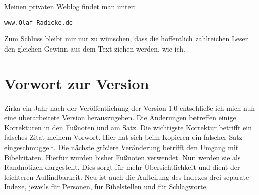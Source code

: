 Meinen privaten Weblog findet man unter:

\begin{center}
\texttt{www.Olaf-Radicke.de}
\end{center}

Zum Schluss bleibt mir nur zu wünschen, dass die hoffentlich zahlreichen Leser
den gleichen Gewinn aus dem Text ziehen werden, wie ich.


\chapter{Vorwort zur Version \versionsnummer}

Zirka ein Jahr nach der Veröffentlichung der Version 1.0 entschließe ich mich 
nun eine überarbeitete Version herauszugeben. Die Änderungen betreffen einige
Korrekturen in den Fußnoten und am Satz. Die wichtigste Korrektur betrifft ein 
falsches Zitat meinem Vorwort. Hier hat sich beim Kopieren ein falscher Satz 
eingeschmuggelt. Die nächste größere Veränderung betrifft den Umgang mit
Bibelzitaten. Hierfür wurden bisher Fußnoten verwendet. Nun werden sie als
Randnotizen dargestellt. Dies sorgt für mehr Übersichtlichkeit 
und dient der leichteren Auffindbarkeit. Neu ist auch die Aufteilung des Indexes 
drei separate Indexe, jeweils für Personen, für Bibelstellen und für Schlagworte.




